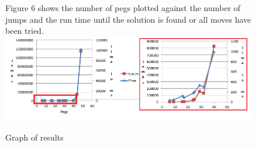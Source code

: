 \documentclass[11pt]{article}
\begin{document}
\begin{figure}
Figure 6 shows the number of pegs plotted against the number of jumps and the run time until the solution is found or all moves have been tried.\newline
\newline
\includegraphics[width=15cm]{7}
\caption{Graph of results} 
\label{fig: 6}


\end{figure}
\end{document}
